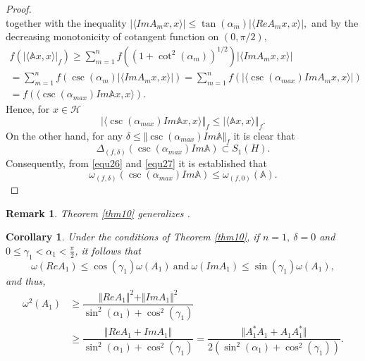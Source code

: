 \documentclass[12pt]{article}
\newtheorem{corollary}{Corollary}
\newtheorem{remark}{Remark}
\begin{document}
\begin{proof}
\[\]
together with the inequality
\(
\vert \langle ImA_{m} x,x \rangle \vert \leq \tan(\alpha_{m}) \vert \langle ReA_{m} x,x \rangle \vert,
\)
and by the decreasing monotonicity of cotangent function on $ \left( 0, {\pi/2} \right), $
\begin{multline*}
f\left( \vert \langle \mathbb{A} x,x \rangle \vert_{f} \right) \geq \sum\limits_{m=1}^{n}f\left( \left(1+\cot^{2}(\alpha_{m}) \right)^{1/2}  \right) \vert \langle ImA_{m} x,x \rangle \vert \\
= \sum\limits_{m=1}^{n}f\left( \csc(\alpha_{m}) \vert \langle ImA_{m} x,x \rangle \vert \right) = \sum\limits_{m=1}^{n}f\left( \vert \langle \csc(\alpha_{max}) ImA_{m} x,x \rangle \vert \right)  \\
= f\left(  \langle \csc(\alpha_{max}) Im \mathbb{A} x,x \rangle \right).
\end{multline*}
Hence, for $ x\in \mathcal{H} $
\begin{equation}
\label{equ26}
\vert \langle \csc(\alpha_{max}) Im\mathbb{A} x,x \rangle \Vert_{f}\leq \vert \langle \mathbb{A} x,x  \rangle \Vert_{f} .
\end{equation}
On the other hand, for any $ \delta \leq \Vert  \csc(\alpha_{max}) Im\mathbb{A}  \Vert_{f} $ it is clear that
\begin{equation}
\label{equ27}
\Delta_{(f,\delta)}(\csc(\alpha_{max}) Im\mathbb{A})\subset S_{1}(H).
\end{equation}
Consequently, from \eqref{equ26} and \eqref{equ27} it is established that
\[
\omega_{(f,\delta)}(\csc(\alpha_{max})Im \mathbb{A})\leq \omega_{(f,0)}(\mathbb{A}).  \tag*{\qedhere}
\]
\end{proof}
\begin{remark}
Theorem \ref{thm10} generalizes \textnormal{\cite[Thm. 3.5]{Ismailov2026}}.
\end{remark}
\begin{corollary}
\label{cor12}
Under the conditions of Theorem \ref{thm10}, if $ n=1, \ \delta=0 $ and $ 0\leq \gamma_{1} <\alpha_{1} < \frac{\pi}{2}  $, it follows that
\[
\omega(ReA_{1})\leq \cos(\gamma_{1}) \omega(A_{1}) \ \text{and} \ \omega(ImA_{1})\leq \sin(\gamma_{1}) \omega(A_{1}),
\]
and thus,
\begin{align*}
\omega^{2}(A_{1}) & \geq \dfrac{\Vert ReA_{1} \Vert^{2}+\Vert ImA_{1} \Vert^{2}} {\sin^{2}(\alpha_{1})+\cos^{2}(\gamma_{1})} \\
& \geq \dfrac{\Vert ReA_{1} + ImA_{1} \Vert} {\sin^{2}(\alpha_{1})+\cos^{2}(\gamma_{1})}
= \dfrac{\Vert A_{1}^{*}A_{1}+A_{1}A_{1}^{*}\Vert} {2\left( \sin^{2}(\alpha_{1})+\cos^{2}(\gamma_{1})\right) } .
\end{align*}
\end{corollary}
\end{document}
